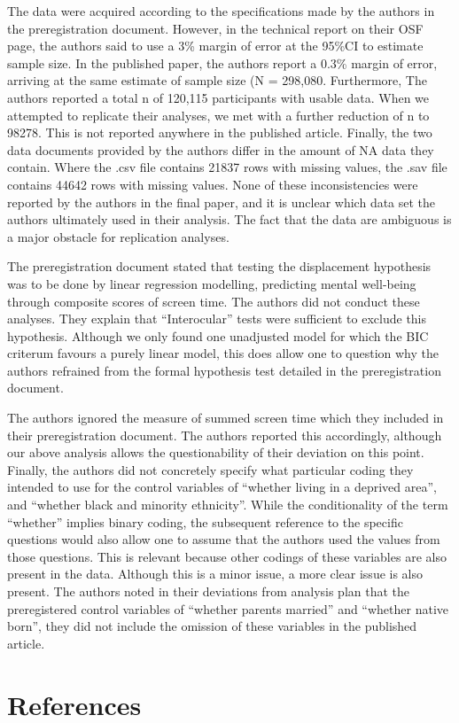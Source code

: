 \documentclass[man]{apa6}
\theoremstyle{definition}
\theoremstyle{definition}
\theoremstyle{definition}
\theoremstyle{remark}
\begin{document}
The data were acquired according to the specifications made by the
authors in the preregistration document. However, in the technical
report on their OSF page, the authors said to use a 3\% margin of error
at the 95\%CI to estimate sample size. In the published paper, the
authors report a 0.3\% margin of error, arriving at the same estimate of
sample size (N = 298,080. Furthermore, The authors reported a total n of
120,115 participants with usable data. When we attempted to replicate
their analyses, we met with a further reduction of n to 98278. This is
not reported anywhere in the published article. Finally, the two data
documents provided by the authors differ in the amount of NA data they
contain. Where the .csv file contains 21837 rows with missing values,
the .sav file contains 44642 rows with missing values. None of these
inconsistencies were reported by the authors in the final paper, and it
is unclear which data set the authors ultimately used in their analysis.
The fact that the data are ambiguous is a major obstacle for replication
analyses.

The preregistration document stated that testing the displacement
hypothesis was to be done by linear regression modelling, predicting
mental well-being through composite scores of screen time. The authors
did not conduct these analyses. They explain that \enquote{Interocular}
tests were sufficient to exclude this hypothesis. Although we only found
one unadjusted model for which the BIC criterum favours a purely linear
model, this does allow one to question why the authors refrained from
the formal hypothesis test detailed in the preregistration document.

The authors ignored the measure of summed screen time which they
included in their preregistration document. The authors reported this
accordingly, although our above analysis allows the questionability of
their deviation on this point. Finally, the authors did not concretely
specify what particular coding they intended to use for the control
variables of \enquote{whether living in a deprived area}, and
\enquote{whether black and minority ethnicity}. While the conditionality
of the term \enquote{whether} implies binary coding, the subsequent
reference to the specific questions would also allow one to assume that
the authors used the values from those questions. This is relevant
because other codings of these variables are also present in the data.
Although this is a minor issue, a more clear issue is also present. The
authors noted in their deviations from analysis plan that the
preregistered control variables of \enquote{whether parents married} and
\enquote{whether native born}, they did not include the omission of
these variables in the published article.

\newpage

\hypertarget{references}{%
\section{References}\label{references}}

\begingroup
\setlength{\parindent}{-0.5in}
\setlength{\leftskip}{0.5in}

\hypertarget{refs}{}

\endgroup
\end{document}
